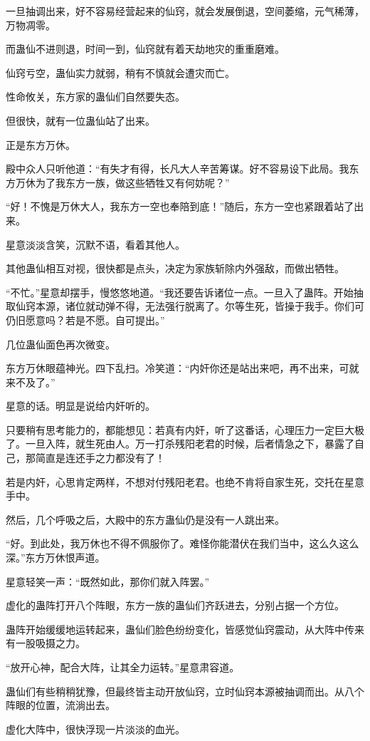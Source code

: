\begin{this_body}
一旦抽调出来，好不容易经营起来的仙窍，就会发展倒退，空间萎缩，元气稀薄，万物凋零。

而蛊仙不进则退，时间一到，仙窍就有着天劫地灾的重重磨难。

仙窍亏空，蛊仙实力就弱，稍有不慎就会遭灾而亡。

性命攸关，东方家的蛊仙们自然要失态。

但很快，就有一位蛊仙站了出来。

正是东方万休。

殿中众人只听他道：“有失才有得，长凡大人辛苦筹谋。好不容易设下此局。我东方万休为了我东方一族，做这些牺牲又有何妨呢？”

“好！不愧是万休大人，我东方一空也奉陪到底！”随后，东方一空也紧跟着站了出来。

星意淡淡含笑，沉默不语，看着其他人。

其他蛊仙相互对视，很快都是点头，决定为家族斩除内外强敌，而做出牺牲。

“不忙。”星意却摆手，慢悠悠地道。“我还要告诉诸位一点。一旦入了蛊阵。开始抽取仙窍本源，诸位就动弹不得，无法强行脱离了。尔等生死，皆操于我手。你们可仍旧愿意吗？若是不愿。自可提出。”

几位蛊仙面色再次微变。

东方万休眼蕴神光。四下乱扫。冷笑道：“内奸你还是站出来吧，再不出来，可就来不及了。”

星意的话。明显是说给内奸听的。

只要稍有思考能力的，都能想见：若真有内奸，听了这番话，心理压力一定巨大极了。一旦入阵，就生死由人。万一打杀残阳老君的时候，后者情急之下，暴露了自己，那简直是连还手之力都没有了！

若是内奸，心思肯定两样，不想对付残阳老君。也绝不肯将自家生死，交托在星意手中。

然后，几个呼吸之后，大殿中的东方蛊仙仍是没有一人跳出来。

“好。到此处，我万休也不得不佩服你了。难怪你能潜伏在我们当中，这么久这么深。”东方万休恨声道。

星意轻笑一声：“既然如此，那你们就入阵罢。”

虚化的蛊阵打开八个阵眼，东方一族的蛊仙们齐跃进去，分别占据一个方位。

蛊阵开始缓缓地运转起来，蛊仙们脸色纷纷变化，皆感觉仙窍震动，从大阵中传来有一股吸摄之力。

“放开心神，配合大阵，让其全力运转。”星意肃容道。

蛊仙们有些稍稍犹豫，但最终皆主动开放仙窍，立时仙窍本源被抽调而出。从八个阵眼的位置，流淌出去。

虚化大阵中，很快浮现一片淡淡的血光。


\end{this_body}
